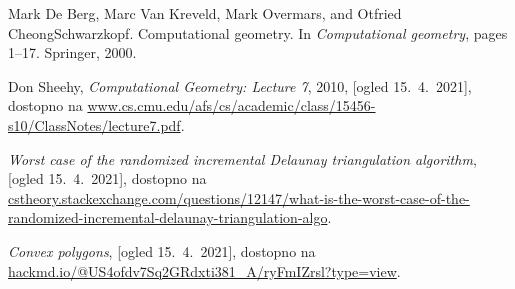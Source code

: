\documentclass[a4paper,11pt]{article}
\begin{document}
\begin{thebibliography}{99}
    Mark De Berg, Marc Van Kreveld, Mark Overmars, and Otfried CheongSchwarzkopf.    Computational  geometry.    In \emph{Computational  geometry}, pages 1–17. Springer, 2000.

    Don Sheehy, \emph{Computational Geometry: Lecture 7}, 2010, [ogled 15.~4.~2021], dostopno na
    \url{www.cs.cmu.edu/afs/cs/academic/class/15456-s10/ClassNotes/lecture7.pdf}.

    \emph{Worst case of the randomized incremental Delaunay triangulation algorithm}, [ogled 15.~4.~2021], dostopno na \url{cstheory.stackexchange.com/questions/12147/what-is-the-worst-case-of-the-randomized-incremental-delaunay-triangulation-algo}.

    \emph{Convex polygons}, [ogled 15.~4.~2021], dostopno na \url{hackmd.io/@US4ofdv7Sq2GRdxti381_A/ryFmIZrsl?type=view}.
    
\end{thebibliography}
    
\end{document}
